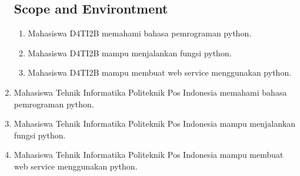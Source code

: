 \begin{enumerate}
\subsection{Scope and Environtment}
	\begin{enumerate}
		\item Mahasiswa D4TI2B memahami bahasa pemrograman python.
		\item Mahasiswa D4TI2B mampu menjalankan fungsi python.
		\item Mahasiswa D4TI2B mampu membuat web service menggunakan python.
	\end{enumerate}
		\item Mahasiswa Tehnik Informatika Politeknik Pos Indonesia memahami bahasa pemrograman python.
		\item Mahasiswa Tehnik Informatika Politeknik Pos Indonesia mampu menjalankan fungsi python.
		\item Mahasiswa Tehnik Informatika Politeknik Pos Indonesia mampu membuat web service menggunakan python.
	\end{enumerate}
